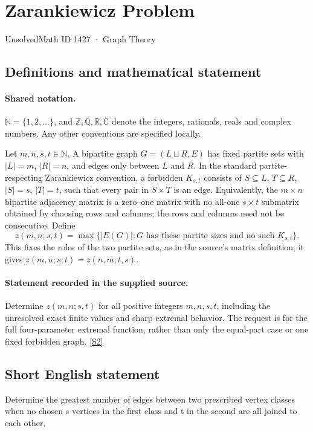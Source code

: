 \documentclass[11pt]{article}
\newcommand{\sref}[2]{\hyperlink{source:#1:#2}{[S#2]}}
\begin{document}
\setcounter{section}{1426}
\section{Zarankiewicz Problem}\label{1427}
{\small\sffamily UnsolvedMath ID 1427 · Graph Theory}
\subsection{Definitions and mathematical statement}

\paragraph{Shared notation.}$\mathbb N=\{1,2,\ldots\}$, and $\mathbb Z,\mathbb Q,\mathbb R,\mathbb C$ denote the integers, rationals, reals and complex numbers. Any other conventions are specified locally.


Let $m,n,s,t\in\mathbb N$. A bipartite graph $G=(L\sqcup R,E)$ has fixed partite sets with $|L|=m$, $|R|=n$, and edges only between $L$ and $R$. In the standard partite-respecting Zarankiewicz convention, a forbidden $K_{s,t}$ consists of $S\subseteq L$, $T\subseteq R$, $|S|=s$, $|T|=t$, such that every pair in $S\times T$ is an edge. Equivalently, the $m\times n$ bipartite adjacency matrix is a zero--one matrix with no all-one $s\times t$ submatrix obtained by choosing rows and columns; the rows and columns need not be consecutive. Define
\[
 z(m,n;s,t)=\max\{|E(G)|:G\text{ has these partite sizes and no such }K_{s,t}\}.
\]
This fixes the roles of the two partite sets, as in the source's matrix definition; it gives $z(m,n;s,t)=z(n,m;t,s)$.
\paragraph{Statement recorded in the supplied source.}
Determine $z(m,n;s,t)$ for all positive integers $m,n,s,t$, including the unresolved exact finite values and sharp extremal behavior. The request is for the full four-parameter extremal function, rather than only the equal-part case or one fixed forbidden graph. \sref{1427}{2}
\subsection{Short English statement}
Determine the greatest number of edges between two prescribed vertex classes when no chosen s vertices in the first class and t in the second are all joined to each other.
\end{document}
